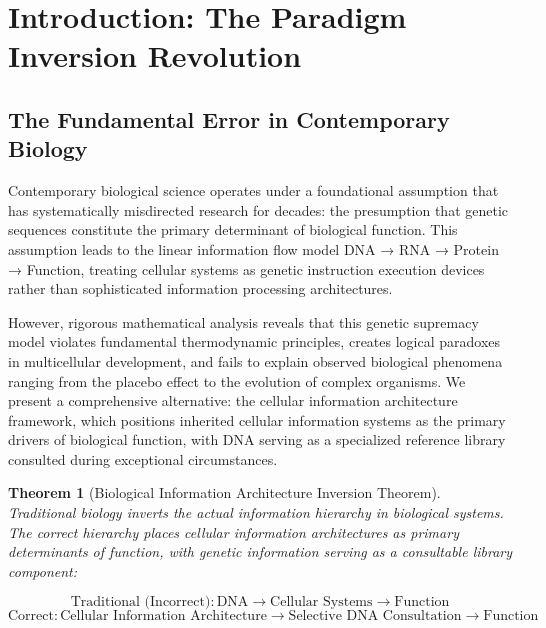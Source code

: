 \documentclass[12pt,a4paper]{article}
\newtheorem{theorem}{Theorem}[section]
\begin{document}
\section{Introduction: The Paradigm Inversion Revolution}

\subsection{The Fundamental Error in Contemporary Biology}

Contemporary biological science operates under a foundational assumption that has systematically misdirected research for decades: the presumption that genetic sequences constitute the primary determinant of biological function. This assumption leads to the linear information flow model DNA → RNA → Protein → Function, treating cellular systems as genetic instruction execution devices rather than sophisticated information processing architectures.

However, rigorous mathematical analysis reveals that this genetic supremacy model violates fundamental thermodynamic principles, creates logical paradoxes in multicellular development, and fails to explain observed biological phenomena ranging from the placebo effect to the evolution of complex organisms. We present a comprehensive alternative: the cellular information architecture framework, which positions inherited cellular information systems as the primary drivers of biological function, with DNA serving as a specialized reference library consulted during exceptional circumstances.

\begin{theorem}[Biological Information Architecture Inversion Theorem]
Traditional biology inverts the actual information hierarchy in biological systems. The correct hierarchy places cellular information architectures as primary determinants of function, with genetic information serving as a consultable library component:

$$\text{Traditional (Incorrect)}: \text{DNA} \rightarrow \text{Cellular Systems} \rightarrow \text{Function}$$
$$\text{Correct}: \text{Cellular Information Architecture} \rightarrow \text{Selective DNA Consultation} \rightarrow \text{Function}$$
\end{theorem}
\end{document}
